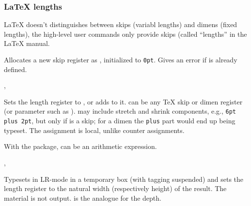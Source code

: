 \documentclass{l3in2edoc}
\begin{document}
%


\subsubsection{\LaTeX{} lengths}

\LaTeX{} doesn't distinguishes between skips (variabl lengths) and
dimens (fixed lengths), the high-level user commands only provide
skips (called \enquote{lengths} in the \LaTeX{} manual.

\begin{function}[user]
  {
    \newlength
  }
  \begin{syntax}
     
  \end{syntax}
  Allocates a new skip register as , initialized to
  \texttt{0pt}. Gives an error if  is already defined.
\end{function}

\begin{function}[user]
  {
    \setlength,
    \addtolength
  }
  \begin{syntax}
      
      
  \end{syntax}
  Sets the length register  to , or adds
   to it.  can be any \TeX{} skip or dimen
  register (or parameter such as ).  may
  include stretch and shrink components, e.g., \texttt{6pt plus 2pt},
  but only if  is a skip; for a dimen the \texttt{plus}
  part would end up being typeset. The assignment is
  local, unlike counter assignments.

  With the  package,  can be an arithmetic expression.
\end{function}


\begin{function}[user]
  {
    \settowidth,
    \settoheight
  }
  \begin{syntax}
      
  \end{syntax}
  Typesets  in LR-mode in a temporary box (with
  tagging suspended) and sets the length register  to the
  natural width (respectively height) of the result. The material is
  not output.  is the analogue for the depth.
\end{function}
\end{document}
